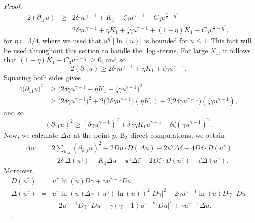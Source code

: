 \documentclass[reqno,11pt]{amsart}
\newcommand{\1}{\mathds{1}}
\numberwithin{equation}{section}
\begin{document}
\begin{proof}
\begin{eqnarray*}
	2\left(\partial_{11}u\right) &\geq & 2\delta \gamma u^{\gamma-1} + K_1 + \zeta \gamma u^{\gamma-1} - C_3 u^{\frac{\gamma}{2}-\eta^\ast}\\
			& = & 2\delta \gamma u^{\gamma-1} + \eta K_1 + \zeta \gamma u^{\gamma-1} + (1-\eta)K_1 - C_3 u^{\frac{\gamma}{2}-\eta^\ast},
\end{eqnarray*}
for $\eta \coloneqq 3/4$, where we used that $u^{\eta^\ast}|\ln(u)|$ is bounded for $u \leq 1$. This fact will be used throughout this section to handle the $\log$-terms. For large $K_1$, it follows that $(1-\eta)K_1 - C_3 u^{\frac{\gamma}{2}-\eta^\ast} \geq 0$, and so
$$
	2\left(\partial_{11}u\right) \geq 2\delta \gamma u^{\gamma-1} +  \eta K_1 + \zeta \gamma u^{\gamma-1}.
$$
Squaring both sides gives
\begin{align*}
4\bigl(\partial_{11}u\bigr)^2 
&\geq \bigl(2\delta \gamma u^{\gamma-1} + \eta K_1 + \zeta \gamma u^{\gamma-1}\bigr)^2 \\[0.5em]
&\geq \bigl(2\delta \gamma u^{\gamma-1}\bigr)^2
   + 2\bigl(2\delta \gamma u^{\gamma-1}\bigr)(\eta K_1)
   + 2\bigl(2\delta \gamma u^{\gamma-1}\bigr)(\zeta \gamma u^{\gamma-1}),
\end{align*}
and so
\begin{equation}\label{ineq for 2 derivative squared}
    \left(\partial_{11}u\right)^2 \geq \left(\delta \gamma u^{\gamma-1}\right)^2 + \delta \gamma \eta K_1 u^{\gamma-1} + \delta \zeta \left(\gamma u^{\gamma-1}\right)^2.
\end{equation}
Now, we calculate $\Delta w$ at the point $p$. By direct computations, we obtain
\begin{eqnarray*}
            \Delta w & = &  2 \sum_{k,j} (\partial_{k,j} u)^2 + 2Du \cdot D(\Delta u) - 2u^\gamma \Delta \delta - 4 D\delta \cdot D(u^\gamma)  \\
             & & - 2\delta\, \Delta(u^\gamma) - K_1\Delta u - u^\gamma \Delta \zeta - 2D\zeta \cdot D(u^\gamma) - \zeta \Delta (u^\gamma).
\end{eqnarray*}
Moreover,
\begin{eqnarray*}
            D(u^\gamma) & = & u^\gamma \ln(u) D\gamma + \gamma u^{\gamma-1}Du,\\[0.2cm]
            \Delta(u^\gamma) & = & u^\gamma \ln(u) \Delta \gamma + u^\gamma (\ln(u))^2 |D\gamma|^2 + 2\gamma u^{\gamma-1} \ln(u) D\gamma \cdot Du \\
             &  & +\, 2u^{\gamma-1} D\gamma \cdot Du + \gamma(\gamma -1)u^{\gamma-2}|Du|^2 + \gamma u^{\gamma-1}\Delta u.

\end{eqnarray*}
\end{proof}
\end{document}
